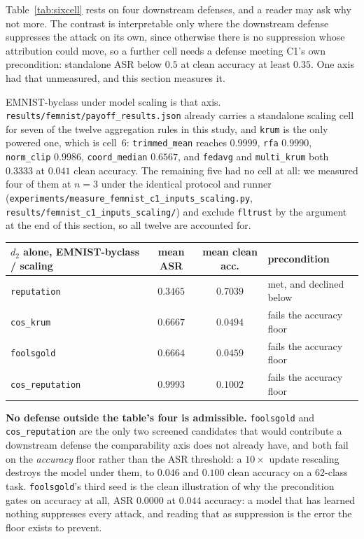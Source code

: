 \documentclass{article}
\begin{document}
Table~\ref{tab:sixcell} rests on four downstream defenses, and a reader may ask why not more. The
contrast is interpretable only where the downstream defense suppresses the attack on its own,
since otherwise there is no suppression whose attribution could move, so a further cell needs a
defense meeting C1's own precondition: standalone ASR below $0.5$ at clean accuracy at least
$0.35$. One axis had that unmeasured, and this section measures it.

EMNIST-byclass under model scaling is that axis. \texttt{results/femnist/payoff\_results.json} already
carries a standalone scaling cell for seven of the twelve aggregation rules in this study, and
\texttt{krum} is the only powered one, which is cell~6: \texttt{trimmed\_mean} reaches $0.9999$,
\texttt{rfa} $0.9990$, \texttt{norm\_clip} $0.9986$, \texttt{coord\_median} $0.6567$, and
\texttt{fedavg} and \texttt{multi\_krum} both $0.3333$ at $0.041$ clean accuracy. The remaining
five had no cell at all: we measured four of them at $n{=}3$ under the identical protocol and
runner (\texttt{experiments/measure\_femnist\_c1\_inputs\_scaling.py},
\texttt{results/femnist\_c1\_inputs\_scaling/}) and exclude \texttt{fltrust} by the argument at the
end of this section, so all twelve are accounted for.

\begin{center}
\begin{tabular}{@{}lccl@{}}
\toprule
$d_2$ alone, EMNIST-byclass / scaling & mean ASR & mean clean acc. & precondition \\
\midrule
\texttt{reputation}     & $0.3465$ & $0.7039$ & met, and declined below \\
\texttt{cos\_krum}      & $0.6667$ & $0.0494$ & fails the accuracy floor \\
\texttt{foolsgold}      & $0.6664$ & $0.0459$ & fails the accuracy floor \\
\texttt{cos\_reputation} & $0.9993$ & $0.1002$ & fails the accuracy floor \\
\bottomrule
\end{tabular}
\end{center}

\textbf{No defense outside the table's four is admissible.} \texttt{foolsgold} and
\texttt{cos\_reputation} are the only two screened candidates that would contribute a downstream
defense the comparability axis does not already have, and both fail on the \emph{accuracy} floor
rather than the ASR threshold: a $10\times$ update rescaling destroys the model under them, to
$0.046$ and $0.100$ clean accuracy on a 62-class task. \texttt{foolsgold}'s third seed is the
clean illustration of why the precondition gates on accuracy at all, ASR $0.0000$ at $0.044$
accuracy: a model that has learned nothing suppresses every attack, and reading that as
suppression is the error the floor exists to prevent.
\end{document}

